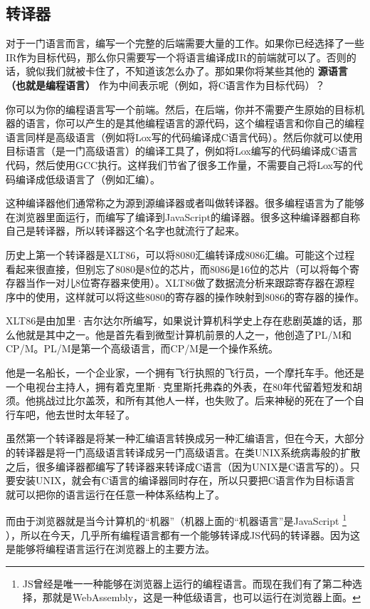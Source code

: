 \documentclass[cn,10pt,math=newtx,citestyle=gb7714-2015,bibstyle=gb7714-2015]{elegantbook}
\begin{document}
\subsection{转译器}

对于一门语言而言，编写一个完整的后端需要大量的工作。如果你已经选择了一些IR作为目标代码，那么你只需要写一个将语言编译成IR的前端就可以了。否则的话，貌似我们就被卡住了，不知道该怎么办了。那如果你将某些其他的 \textbf{源语言（也就是编程语言）} 作为中间表示呢（例如，将C语言作为目标代码）？

你可以为你的编程语言写一个前端。然后，在后端，你并不需要产生原始的目标机器的语言，你可以产生的是其他编程语言的源代码，这个编程语言和你自己的编程语言同样是高级语言（例如将Lox写的代码编译成C语言代码）。然后你就可以使用目标语言（是一门高级语言）的编译工具了，例如将Lox编写的代码编译成C语言代码，然后使用GCC执行。这样我们节省了很多工作量，不需要自己将Lox写的代码编译成低级语言了（例如汇编）。

这种编译器他们通常称之为源到源编译器或者叫做转译器。很多编程语言为了能够在浏览器里面运行，而编写了编译到JavaScript的编译器。很多这种编译器都自称自己是转译器，所以转译器这个名字也就流行了起来。

\begin{tcolorbox}
历史上第一个转译器是XLT86，可以将8080汇编转译成8086汇编。可能这个过程看起来很直接，但别忘了8080是8位的芯片，而8086是16位的芯片（可以将每个寄存器当作一对儿8位寄存器来使用）。XLT86做了数据流分析来跟踪寄存器在源程序中的使用，这样就可以将这些8080的寄存器的操作映射到8086的寄存器的操作。

XLT86是由加里·吉尔达尔所编写，如果说计算机科学史上存在悲剧英雄的话，那么他就是其中之一。他是首先看到微型计算机前景的人之一，他创造了PL/M和CP/M。PL/M是第一个高级语言，而CP/M是一个操作系统。

他是一名船长，一个企业家，一个拥有飞行执照的飞行员，一个摩托车手。他还是一个电视台主持人，拥有着克里斯·克里斯托弗森的外表，在80年代留着短发和胡须。他挑战过比尔盖茨，和所有其他人一样，也失败了。后来神秘的死在了一个自行车吧，他去世时太年轻了。
\end{tcolorbox}

虽然第一个转译器是将某一种汇编语言转换成另一种汇编语言，但在今天，大部分的转译器是将一门高级语言转译成另一门高级语言。在类UNIX系统病毒般的扩散之后，很多编译器都编写了转译器来转译成C语言（因为UNIX是C语言写的）。只要安装UNIX，就会有C语言的编译器同时存在，所以只要把C语言作为目标语言就可以把你的语言运行在任意一种体系结构上了。

而由于浏览器就是当今计算机的“机器”（机器上面的“机器语言”是JavaScript \footnote{JS曾经是唯一一种能够在浏览器上运行的编程语言。而现在我们有了第二种选择，那就是WebAssembly，这是一种低级语言，也可以运行在浏览器上面。} ），所以在今天，几乎所有编程语言都有一个能够转译成JS代码的转译器。因为这是能够将编程语言运行在浏览器上的主要方法。
\end{document}
